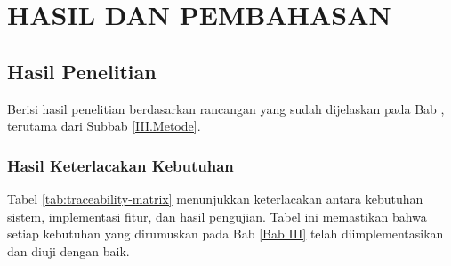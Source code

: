 \chapter{HASIL DAN PEMBAHASAN} \label{Bab IV}

\section{Hasil Penelitian} \label{IV.Hasil}
Berisi hasil penelitian berdasarkan rancangan yang sudah dijelaskan pada Bab , terutama dari Subbab \ref{III.Metode}.\par

\subsection{Hasil Keterlacakan Kebutuhan} \label{IV.Traceability}

Tabel \ref{tab:traceability-matrix} menunjukkan keterlacakan antara kebutuhan sistem, implementasi fitur, dan hasil pengujian. Tabel ini memastikan bahwa setiap kebutuhan yang dirumuskan pada Bab \ref{Bab III} telah diimplementasikan dan diuji dengan baik.


